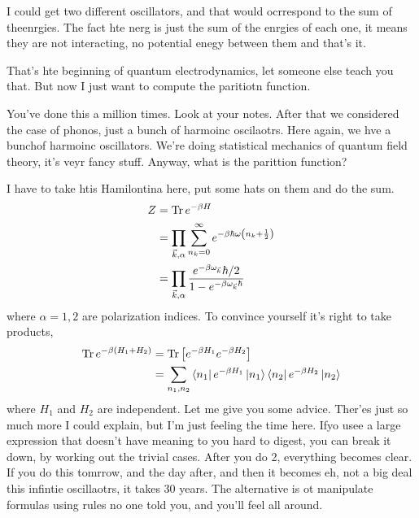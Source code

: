 I could get two different oscillators,
and that would ocrrespond to the sum of theenrgies.
The fact hte nerg is just the sum of the enrgies of each one,
it means they are not interacting,
no potential enegy between them and that's it.

That's hte beginning of quantum electrodynamics,
let someone else teach you that.
But now I just want to compute the paritiotn function.

You've done this a million times.
Look at your notes.
After that we considered the case of phonos,
just a bunch of harmoinc oscilaotrs.
Here again,
we hve a bunchof harmoinc oscillators.
We're doing statistical mechanics of quantum field theory,
it's veyr fancy stuff.
Anyway,
what is the parittion function?

I have to take htis Hamilontina here,
put some hats on them and do the sum.
\begin{align}
    Z &=
    \Tr e^{-\beta H}\\
    &=
    \prod_{\vec{k},{\alpha}}
    \sum_{n_k=0}^{\infty}
    e^{-\beta \hbar \omega \left(n_{k} + \frac{1}{2}  \right)}\\
    &= \prod_{\vec{k},\alpha}
    \frac{e^{-\beta \omega_{\vec{k}}} \hbar/2}{%
    1 - e^{-\beta \omega_{\vec{k}}\hbar}}
\end{align}
where $\alpha=1,2$ are polarization indices.
To convince yourself it's right to take products,
\begin{align}
    \Tr e^{-\beta \left( H_1 + H_2 \right)} &=
    \Tr\left[
    e^{-\beta H_1} e^{-\beta H_2}
    \right]\\
    &=
    \sum_{n_1,n_2} \bra{n_1} e^{-\beta H_1} \ket{n_1}
    \bra{n_2} e^{-\beta H_2}\ket{n_2}
\end{align}
where $H_1$ and $H_2$ are independent.
Let me give you some advice.
Ther'es just so much more I could explain,
but I'm just feeling the time here.
Ifyo usee a large expression that doesn't have meaning to you hard to digest,
you can break it down,
by working out the trivial cases.
After you do 2,
everything becomes clear.
If you do this tomrrow,
and the day after,
and then it becomes eh,
not a big deal this infintie oscillaotrs,
it takes 30 years.
The alternative is ot manipulate formulas using rules no one told you,
and you'll feel all around.

